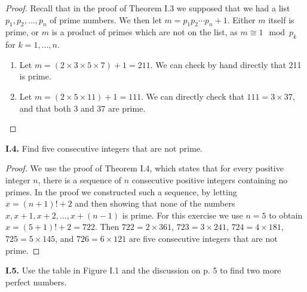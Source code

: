 \documentclass[12pt]{amsart}
\newenvironment{statement}[1]{\smallskip\noindent\color[rgb]{.6627, .3529, .6314} {\bf #1.}}{}
\theoremstyle{definition}
\theoremstyle{remark}
\begin{document}
\begin{proof}
Recall that in the proof of Theorem I.3 we supposed that we had a list $p_1, p_2, \dots, p_n$ of prime numbers.
We then let $m = p_1 p_2 \cdots p_n + 1$.
Either $m$ itself is prime, or $m$ is a product of primes which are not on the list, as $m \cong 1 \mod p_k$ for $k = 1, \dots, n$.
\begin{enumerate}
	\item Let $m = (2 \times 3 \times 5 \times 7)  + 1 = 211$.
	We can check by hand directly that 211 is prime.
	
	\item Let $m = (2 \times 5 \times 11) + 1 = 111$.
	We can directly check that $111 = 3 \times 37$, and that both 3 and 37 are prime.
\end{enumerate}
\end{proof}


\begin{statement}{I.4}
Find five consecutive integers that are not prime.
\end{statement}

\begin{proof}
We use the proof of Theorem I.4, which states that for every positive integer $n$, there is a sequence of $n$ consecutive positive integers containing no primes.
In the proof we constructed such a sequence, by letting $x = (n + 1)! + 2$ and then showing that none of the numbers $x, x + 1, x + 2, \dots, x + (n - 1)$ is prime.
For this exercise we use $n = 5$ to obtain $x = (5 + 1)! + 2 = 722$.
Then $722 = 2 \times 361$, $723 = 3 \times 241$, $724 = 4 \times 181$, $725 = 5 \times 145$, and $726 = 6 \times 121$
are five consecutive integers that are not prime.
\end{proof}


\begin{statement}{I.5}
Use the table in Figure I.1 and the discussion on p. 5 to find two more perfect numbers.
\end{statement}
\end{document}

